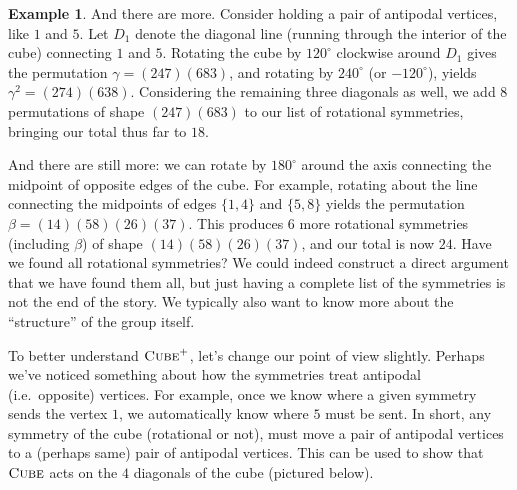 \documentclass[11pt]{amsart}
\theoremstyle{plain}
\theoremstyle{definition}
\newtheorem{example}{Example}
\theoremstyle{remark}
\newcommand{\symcube}{\textsc{Cube}}
\newcommand{\rsymcube}{\textsc{Cube}^+}
\begin{document}
\begin{example}
And there are more. Consider holding a pair of antipodal vertices, like $1$ and $5$. Let $D_1$ denote the diagonal line (running through the interior of the cube) connecting  $1$ and $5$. Rotating the cube by $120^\circ$ clockwise around $D_1$ gives the permutation $\gamma = (247)(683)$, and rotating by $240^\circ$ (or $-120^\circ$), yields $\gamma^2 = (274)(638)$. Considering the remaining three diagonals as well, we add $8$ permutations of shape $(247)(683)$ to our list of rotational symmetries, bringing our total thus far to $18$. 

And there are still more: we can rotate by $180^\circ$ around the axis connecting the midpoint of opposite edges of the cube. For example, rotating about the line connecting the midpoints of edges $\{1,4\}$ and $\{5,8\}$ yields the permutation $\beta = (14)(58)(26)(37)$. This produces $6$ more rotational symmetries (including $\beta$) of shape $(14)(58)(26)(37)$, and our total is now $24$. Have we found all rotational symmetries?  We could indeed construct a direct  argument that we have found them all, but just having a complete list of the symmetries is not the end of the story. We typically also want to know more about the ``structure'' of the  group itself.

To better understand $\rsymcube$, let's change our point of view slightly. Perhaps we've noticed something about how the symmetries treat antipodal (i.e.~opposite) vertices. For example,  once we know where a given symmetry sends the vertex $1$, we automatically know where $5$ must be sent. In short, any symmetry of the cube (rotational or not), must move a pair of antipodal vertices to a (perhaps same) pair of antipodal vertices. This can be used to show that $\symcube$ acts on the $4$ diagonals of the cube (pictured below). 
\begin{center}
\end{center}
\end{example}
\end{document}
